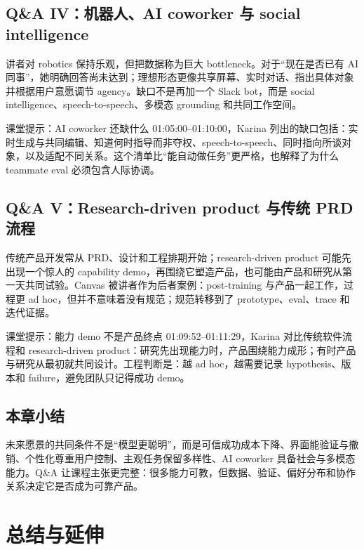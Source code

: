 \documentclass[a4paper]{article}
\begin{document}
\subsection{Q\&A IV：机器人、AI coworker 与 social intelligence}

讲者对 robotics 保持乐观，但把数据称为巨大 bottleneck。对于“现在是否已有 AI 同事”，她明确回答尚未达到；理想形态更像共享屏幕、实时对话、指出具体对象并根据用户意愿调节 agency。缺口不是再加一个 Slack bot，而是 social intelligence、speech-to-speech、多模态 grounding 和共同工作空间。

\begin{knowledgebox}{课堂提示：AI coworker 还缺什么}
01:05:00--01:10:00，Karina 列出的缺口包括：实时生成与共同编辑、知道何时指导而非夺权、speech-to-speech、同时指向所谈对象，以及适配不同关系。这个清单比“能自动做任务”更严格，也解释了为什么 teammate eval 必须包含人际协调。
\end{knowledgebox}

\subsection{Q\&A V：Research-driven product 与传统 PRD 流程}

传统产品开发常从 PRD、设计和工程排期开始；research-driven product 可能先出现一个惊人的 capability demo，再围绕它塑造产品，也可能由产品和研究从第一天共同试验。Canvas 被讲者作为后者案例：post-training 与产品一起工作，过程更 ad hoc，但并不意味着没有规范；规范转移到了 prototype、eval、trace 和迭代证据。

\begin{importantbox}{课堂提示：能力 demo 不是产品终点}
01:09:52--01:11:29，Karina 对比传统软件流程和 research-driven product：研究先出现能力时，产品围绕能力成形；有时产品与研究从最初就共同设计。工程判断是：越 ad hoc，越需要记录 hypothesis、版本和 failure，避免团队只记得成功 demo。
\end{importantbox}

\subsection{本章小结}

未来愿景的共同条件不是“模型更聪明”，而是可信成功成本下降、界面能验证与撤销、个性化尊重用户控制、主观任务保留多样性、AI coworker 具备社会与多模态能力。Q\&A 让课程主张更完整：很多能力可教，但数据、验证、偏好分布和协作关系决定它是否成为可靠产品。

\section{总结与延伸}
\end{document}
